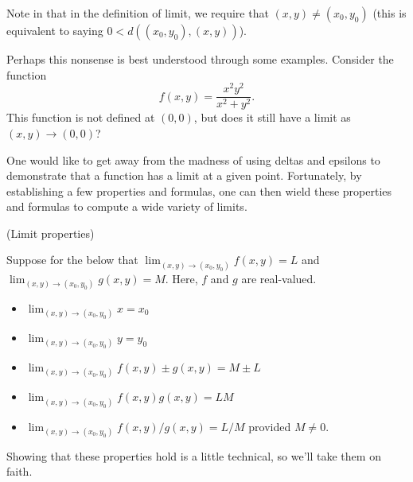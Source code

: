 \documentclass{article}
\begin{document}
Note in that in the definition of limit, we require that $(x,y) \neq (x_0,y_0)$ 
(this is equivalent to saying $0 < d((x_0,y_0),(x,y))$).


Perhaps this nonsense is best understood through some examples. Consider the function 
\[f(x,y)=\frac{x^2 y^2}{x^2+y^2}.\]
This function is not defined at $(0,0)$, but does it still have a limit as $(x,y) \to (0,0)$? 

One would like to get away from the madness of using deltas and epsilons to demonstrate that a function
has a limit at a given point. Fortunately, by establishing a few properties and formulas, one can then wield
these properties and formulas to compute a wide variety of limits.

\begin{proposition} (Limit properties)


Suppose for the below that $\lim_{(x,y) \to (x_0,y_0)} f(x,y) = L$ and $\lim_{(x,y) \to (x_0,y_0)} g(x,y) = M$. Here,
$f$ and $g$ are real-valued.
    \begin{itemize}
        \item $\lim_{(x,y) \to (x_0,y_0)} x = x_0$ 
        \item $\lim_{(x,y) \to (x_0,y_0)} y = y_0$
        \item $\lim_{(x,y) \to (x_0,y_0)} f(x,y) \pm g(x,y) = M \pm L$
        \item $\lim_{(x,y) \to (x_0,y_0)} f(x,y)g(x,y) = LM$
        \item $\lim_{(x,y) \to (x_0,y_0)} f(x,y)/g(x,y) = L/M$ provided $M\neq 0$.
    \end{itemize}
\end{proposition}

Showing that these properties hold is a little technical, so we'll take them on faith.
\end{document}
